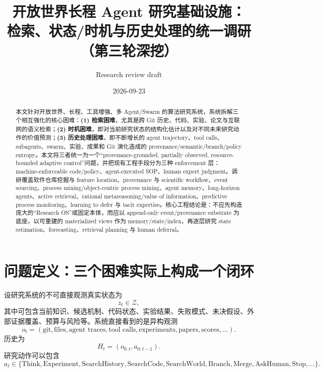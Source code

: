 \documentclass[11pt,a4paper]{ctexart}
\title{开放世界长程 Agent 研究基础设施：\\检索、状态/时机与历史处理的统一调研（第三轮深挖）}
\author{Research review draft}
\date{2026-09-23}
\newcommand{\Z}{\mathcal{Z}}
\begin{document}
\maketitle

\begin{abstract}
本文针对开放世界、长程、工具增强、多 Agent/Swarm 的算法研究系统，系统拆解三个相互强化的核心困难：\textbf{(1) 检索困难}，尤其是跨 Git 历史、代码、实验、论文与互联网的语义检索；\textbf{(2) 时机困难}，即对当前研究状态的结构化估计以及对不同未来研究动作的价值预测；\textbf{(3) 历史处理困难}，即不断增长的 agent trajectory、tool calls、subagents、swarm、实验、成果和 Git 演化造成的 provenance/semantic/branch/policy entropy。本文将三者统一为一个“provenance-grounded, partially observed, resource-bounded adaptive control”问题，并把现有工程手段分为三种 enforcement 层：machine-enforceable code/policy、agent-executed SOP、human expert judgment。调研覆盖软件仓库挖掘与 feature location、provenance 与 scientific workflow、event sourcing、process mining/object-centric process mining、agent memory、long-horizon agents、active retrieval、rational metareasoning/value of information、predictive process monitoring、learning to defer 与 tacit expertise。核心工程结论是：不应先构造庞大的“Research OS”或固定本体，而应以 append-only event/provenance substrate 为底座，以可重建的 materialized views 作为 memory/state/index，再逐层研究 state estimation、forecasting、retrieval planning 与 human deferral。
\end{abstract}

\tableofcontents

\section{问题定义：三个困难实际上构成一个闭环}

设研究系统的不可直接观测真实状态为
\begin{equation}
 z_t\in\Z,
\end{equation}
其中可包含当前知识、候选机制、代码状态、实验结果、失败模式、未决假设、外部证据覆盖、预算与风险等。系统直接看到的是异构观测
\begin{equation}
 o_t=(\text{git},\text{files},\text{agent traces},\text{tool calls},\text{experiments},\text{papers},\text{scores},\ldots).
\end{equation}
历史为
\begin{equation}
 H_t=(o_{0:t},a_{0:t-1}).
\end{equation}
研究动作可以包含
\begin{equation}
 a_t\in\{\text{Think},\text{Experiment},\text{SearchHistory},\text{SearchCode},\text{SearchWorld},\text{Branch},\text{Merge},\text{AskHuman},\text{Stop},\ldots\}.
\end{equation}
\end{document}
